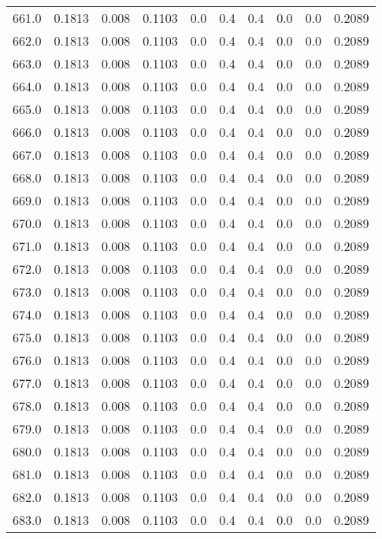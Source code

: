 \begin{longtable}{lrrrrrrrrr}
661.0 & 0.1813 & 0.008 & 0.1103 & 0.0 & 0.4 & 0.4 & 0.0 & 0.0 & 0.2089 \\
662.0 & 0.1813 & 0.008 & 0.1103 & 0.0 & 0.4 & 0.4 & 0.0 & 0.0 & 0.2089 \\
663.0 & 0.1813 & 0.008 & 0.1103 & 0.0 & 0.4 & 0.4 & 0.0 & 0.0 & 0.2089 \\
664.0 & 0.1813 & 0.008 & 0.1103 & 0.0 & 0.4 & 0.4 & 0.0 & 0.0 & 0.2089 \\
665.0 & 0.1813 & 0.008 & 0.1103 & 0.0 & 0.4 & 0.4 & 0.0 & 0.0 & 0.2089 \\
666.0 & 0.1813 & 0.008 & 0.1103 & 0.0 & 0.4 & 0.4 & 0.0 & 0.0 & 0.2089 \\
667.0 & 0.1813 & 0.008 & 0.1103 & 0.0 & 0.4 & 0.4 & 0.0 & 0.0 & 0.2089 \\
668.0 & 0.1813 & 0.008 & 0.1103 & 0.0 & 0.4 & 0.4 & 0.0 & 0.0 & 0.2089 \\
669.0 & 0.1813 & 0.008 & 0.1103 & 0.0 & 0.4 & 0.4 & 0.0 & 0.0 & 0.2089 \\
670.0 & 0.1813 & 0.008 & 0.1103 & 0.0 & 0.4 & 0.4 & 0.0 & 0.0 & 0.2089 \\
671.0 & 0.1813 & 0.008 & 0.1103 & 0.0 & 0.4 & 0.4 & 0.0 & 0.0 & 0.2089 \\
672.0 & 0.1813 & 0.008 & 0.1103 & 0.0 & 0.4 & 0.4 & 0.0 & 0.0 & 0.2089 \\
673.0 & 0.1813 & 0.008 & 0.1103 & 0.0 & 0.4 & 0.4 & 0.0 & 0.0 & 0.2089 \\
674.0 & 0.1813 & 0.008 & 0.1103 & 0.0 & 0.4 & 0.4 & 0.0 & 0.0 & 0.2089 \\
675.0 & 0.1813 & 0.008 & 0.1103 & 0.0 & 0.4 & 0.4 & 0.0 & 0.0 & 0.2089 \\
676.0 & 0.1813 & 0.008 & 0.1103 & 0.0 & 0.4 & 0.4 & 0.0 & 0.0 & 0.2089 \\
677.0 & 0.1813 & 0.008 & 0.1103 & 0.0 & 0.4 & 0.4 & 0.0 & 0.0 & 0.2089 \\
678.0 & 0.1813 & 0.008 & 0.1103 & 0.0 & 0.4 & 0.4 & 0.0 & 0.0 & 0.2089 \\
679.0 & 0.1813 & 0.008 & 0.1103 & 0.0 & 0.4 & 0.4 & 0.0 & 0.0 & 0.2089 \\
680.0 & 0.1813 & 0.008 & 0.1103 & 0.0 & 0.4 & 0.4 & 0.0 & 0.0 & 0.2089 \\
681.0 & 0.1813 & 0.008 & 0.1103 & 0.0 & 0.4 & 0.4 & 0.0 & 0.0 & 0.2089 \\
682.0 & 0.1813 & 0.008 & 0.1103 & 0.0 & 0.4 & 0.4 & 0.0 & 0.0 & 0.2089 \\
683.0 & 0.1813 & 0.008 & 0.1103 & 0.0 & 0.4 & 0.4 & 0.0 & 0.0 & 0.2089 \\

\end{longtable}

